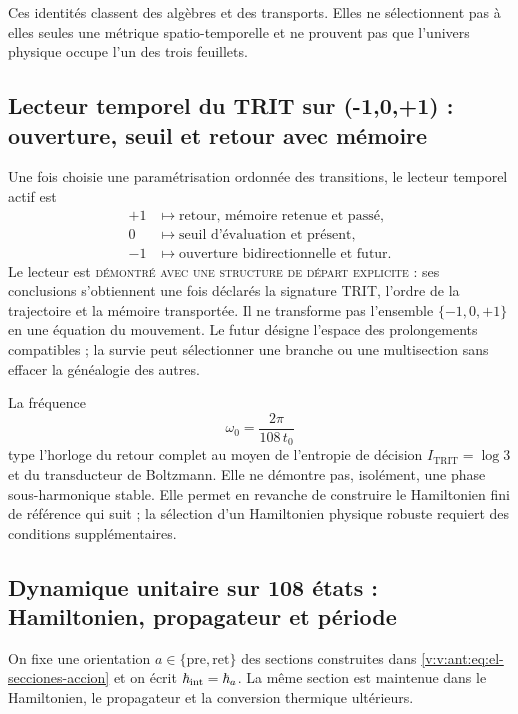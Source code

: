 Ces identités classent des algèbres et des transports. Elles ne sélectionnent pas à elles
seules une métrique spatio-temporelle et ne prouvent pas que l’univers physique occupe l’un
des trois feuillets.

\subsection{Lecteur temporel du TRIT sur ({-1,0,+1}) : ouverture, seuil et retour avec mémoire}
\label{v:v:rec:sec:lector-temporal-trit}

Une fois choisie une paramétrisation ordonnée des transitions, le lecteur
temporel actif est
\[
\begin{aligned}
 +1&\longmapsto
 \text{retour, mémoire retenue et passé},\\
 0&\longmapsto
 \text{seuil d'évaluation et présent},\\
 -1&\longmapsto
 \text{ouverture bidirectionnelle et futur}.
\end{aligned}
\]
Le lecteur est \textsc{démontré avec une structure de départ explicite} : ses
conclusions s’obtiennent une fois déclarés la signature TRIT, l’ordre de la
trajectoire et la mémoire transportée. Il ne transforme pas l’ensemble
\(\{-1,0,+1\}\) en une équation du mouvement. Le futur désigne l’espace
des prolongements compatibles ; la survie peut sélectionner une branche
ou une multisection sans effacer la généalogie des autres.

La fréquence
\[
 \omega_0=\frac{2\pi}{108\,t_0}
\]
type l’horloge du retour complet au moyen de l’entropie de décision
\(I_{\mathrm{TRIT}}=\log 3\) et du transducteur de Boltzmann.
Elle ne démontre pas, isolément, une phase sous-harmonique stable. Elle permet en revanche de construire le
Hamiltonien fini de référence qui suit ; la sélection d’un Hamiltonien
physique robuste requiert des conditions supplémentaires.

\subsection{Dynamique unitaire sur 108 états : Hamiltonien, propagateur et période}
\label{v:v:rec:sec:hamiltoniano-reloj-108}

On fixe une orientation \(a\in\{\mathrm{pre},\mathrm{ret}\}\) des
sections construites dans \eqref{v:v:ant:eq:el-secciones-accion} et on écrit
\(\hbar_{\rm int}=\hbar_a\). La même section est maintenue dans le
Hamiltonien, le propagateur et la conversion thermique ultérieurs.

